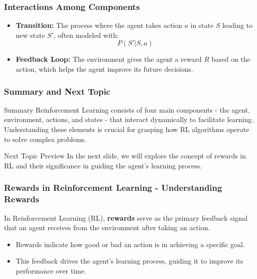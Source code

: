 \documentclass[aspectratio=169]{beamer}
\begin{document}
\begin{frame}[fragile]
    \frametitle{Interactions Among Components}
    \begin{itemize}
        \item \textbf{Transition:} The process where the agent takes action \( a \) in state \( S \) leading to new state \( S' \), often modeled with:
        \[
        P(S' | S, a)
        \]
        \item \textbf{Feedback Loop:} The environment gives the agent a reward \( R \) based on the action, which helps the agent improve its future decisions.
    \end{itemize}
\end{frame}

\begin{frame}[fragile]
    \frametitle{Summary and Next Topic}
    \begin{block}{Summary}
        Reinforcement Learning consists of four main components - the agent, environment, actions, and states - that interact dynamically to facilitate learning. Understanding these elements is crucial for grasping how RL algorithms operate to solve complex problems.
    \end{block}
    
    \begin{block}{Next Topic Preview}
        In the next slide, we will explore the concept of rewards in RL and their significance in guiding the agent's learning process.
    \end{block}
\end{frame}

\begin{frame}[fragile]
    \frametitle{Rewards in Reinforcement Learning - Understanding Rewards}
    In Reinforcement Learning (RL), \textbf{rewards} serve as the primary feedback signal that an agent receives from the environment after taking an action. 
    \begin{itemize}
        \item Rewards indicate how good or bad an action is in achieving a specific goal.
        \item This feedback drives the agent's learning process, guiding it to improve its performance over time.
    \end{itemize}
\end{frame}
\end{document}
